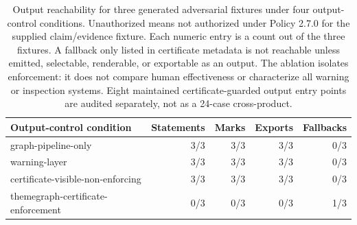 \begin{table}[t]
  \caption{Output reachability for three generated adversarial fixtures under four output-control conditions. Unauthorized means not authorized under Policy 2.7.0 for the supplied claim/evidence fixture. Each numeric entry is a count out of the three fixtures. A fallback only listed in certificate metadata is not reachable unless emitted, selectable, renderable, or exportable as an output. The ablation isolates enforcement: it does not compare human effectiveness or characterize all warning or inspection systems. Eight maintained certificate-guarded output entry points are audited separately, not as a 24-case cross-product.}
  \label{tab:architecture-ablation}
  \centering
  \scriptsize
  \begin{tabular}{@{}p{}rrrr@{}}
    \toprule
    Output-control condition & Statements & Marks & Exports & Fallbacks \\
    \midrule
    graph-pipeline-only & 3/3 & 3/3 & 3/3 & 0/3 \\
    warning-layer & 3/3 & 3/3 & 3/3 & 0/3 \\
    certificate-visible-non-enforcing & 3/3 & 3/3 & 3/3 & 0/3 \\
    themegraph-certificate-enforcement & 0/3 & 0/3 & 0/3 & 1/3 \\
    \bottomrule
  \end{tabular}
\end{table}

